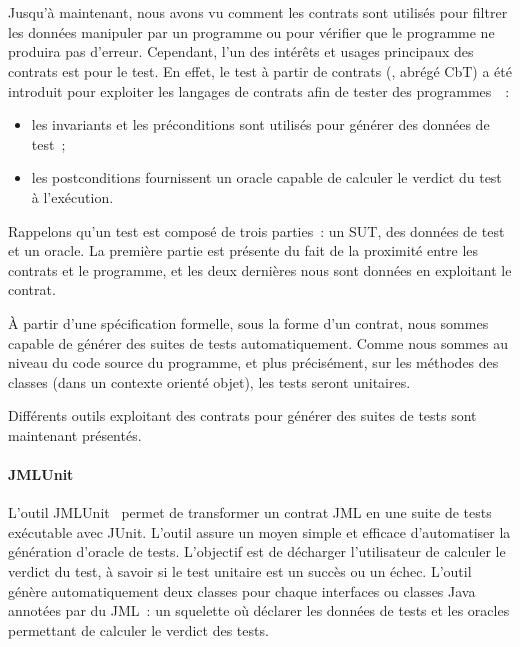 \section{}
\label{section:sota:cbt}

Jusqu'à maintenant, nous avons vu comment les contrats sont utilisés pour
{\strong filtrer} les données manipuler par un programme ou pour vérifier que le
programme ne produira pas d'erreur. Cependant, l'un des intérêts et usages
principaux des contrats est pour le {\strong test}. En effet, le {\strong test à
partir de contrats} (, abrégé CbT) a été
introduit pour exploiter les langages de contrats afin de tester des
programmes~~:

\begin{itemize}

\item les invariants et les préconditions sont utilisés pour {\strong générer
des données} de test~;

\item les postconditions {\strong fournissent un oracle} capable de calculer le
verdict du test à l'exécution.

\end{itemize}
%
Rappelons qu'un test est composé de trois parties~: un SUT, des données de test
et un oracle. La première partie est présente du fait de la proximité entre les
contrats et le programme, et les deux dernières nous sont données en exploitant
le contrat.

À partir d'une spécification formelle, sous la forme d'un contrat, nous sommes
capable de générer des suites de tests automatiquement. Comme nous sommes au
niveau du code source du programme, et plus précisément, sur les méthodes des
classes (dans un contexte orienté objet), les tests seront {\strong unitaires}.

Différents outils exploitant des contrats pour générer des suites de tests sont
maintenant présentés.

\paragraph{JMLUnit} L'outil JMLUnit~ permet de
transformer un contrat JML en une suite de tests exécutable avec JUnit. L'outil
assure un moyen simple et efficace d'automatiser la génération d'oracle de
tests.  L'objectif est de décharger l'utilisateur de calculer le verdict du
test, à savoir si le test unitaire est un succès ou un échec. L'outil génère
automatiquement deux classes pour chaque interfaces ou classes Java annotées par
du JML~: un squelette où déclarer les données de tests et les oracles permettant
de calculer le verdict des tests.

